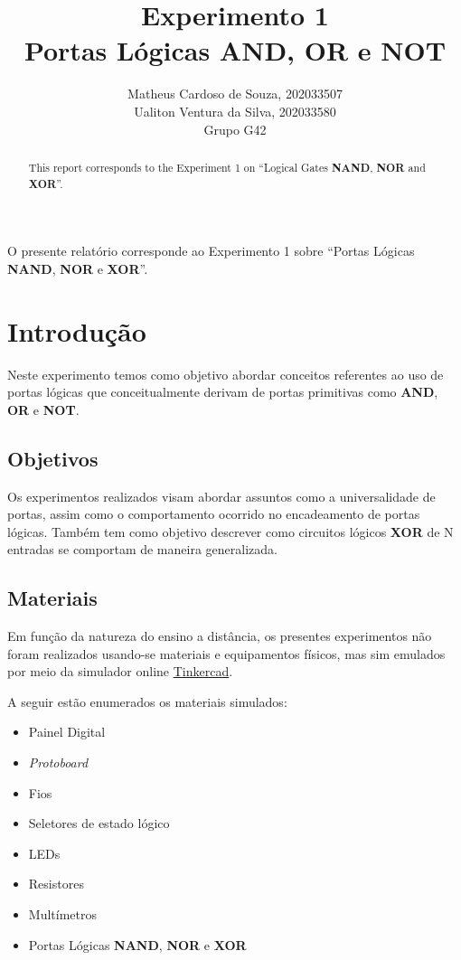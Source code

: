 \documentclass[12pt]{article}
\title{Experimento 1\\
Portas Lógicas AND, OR e NOT}
\author{Matheus Cardoso de Souza, 202033507\\
        Ualiton Ventura da Silva, 202033580\\
        Grupo G42
}
\begin{document}
\maketitle

 \begin{abstract}
   This report corresponds to the Experiment 1 on ``Logical Gates \textbf{NAND}, \textbf{NOR} and \textbf{XOR}''.
 \end{abstract}

 \begin{resumo}
  O presente relatório corresponde ao Experimento 1 sobre ``Portas Lógicas \textbf{NAND}, \textbf{NOR} e \textbf{XOR}''.
 \end{resumo}


\section{Introdução}
\label{sec:Introducao}


Neste experimento temos como objetivo abordar conceitos referentes ao uso de portas lógicas que conceitualmente derivam de portas primitivas como \textbf{AND}, \textbf{OR} e \textbf{NOT}.

\subsection{Objetivos}
\label{sec:Objetivos}

Os experimentos realizados visam abordar assuntos como a universalidade de portas, assim como o comportamento ocorrido no encadeamento de portas lógicas. Também tem como objetivo descrever como circuitos lógicos \textbf{XOR} de N entradas se comportam de maneira generalizada.

\subsection{Materiais}
\label{sec:Materiais}
Em função da natureza do ensino a distância, os presentes experimentos não foram
realizados usando-se materiais e equipamentos físicos, mas sim emulados por meio
da simulador online \href{https://www.tinkercad.com/}{Tinkercad}.

A seguir estão enumerados os materiais simulados:
\begin{itemize}
    \item Painel Digital
    \item \textit{Protoboard}
    \item Fios
    \item Seletores de estado lógico
    \item LEDs
    \item Resistores
    \item Multímetros
    \item Portas Lógicas \textbf{NAND}, \textbf{NOR} e \textbf{XOR}
\end{itemize}
\end{document}
